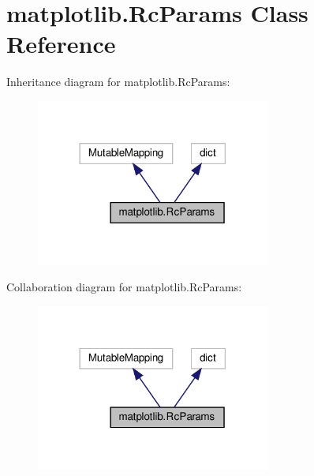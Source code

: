\hypertarget{classmatplotlib_1_1RcParams}{}\section{matplotlib.\+Rc\+Params Class Reference}
\label{classmatplotlib_1_1RcParams}


Inheritance diagram for matplotlib.\+Rc\+Params\+:
\nopagebreak
\begin{figure}[H]
\begin{center}
\leavevmode
\includegraphics[width=218pt]{classmatplotlib_1_1RcParams__inherit__graph}
\end{center}
\end{figure}


Collaboration diagram for matplotlib.\+Rc\+Params\+:
\nopagebreak
\begin{figure}[H]
\begin{center}
\leavevmode
\includegraphics[width=218pt]{classmatplotlib_1_1RcParams__coll__graph}
\end{center}
\end{figure}
